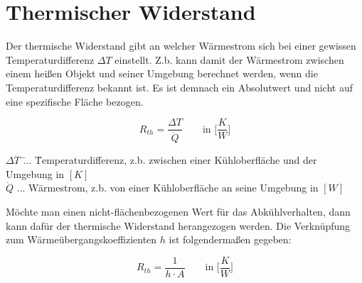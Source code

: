 \documentclass[a4paper, 10pt]{scrartcl}
\begin{document}
	\section{Thermischer Widerstand}
		Der thermische Widerstand gibt an welcher Wärmestrom sich bei einer gewissen Temperaturdifferenz $ \Delta T $ einstellt. Z.b. kann damit der Wärmestrom zwischen einem heißen Objekt und seiner Umgebung berechnet werden, wenn die Temperaturdifferenz bekannt ist. Es ist demnach ein Absolutwert und nicht auf eine spezifische Fläche bezogen.
		\begin{tcolorbox}[title=Definition des Wärmewiderstands]
			\[ R_{th} = \dfrac{\Delta T}{\dot{Q}} \qquad \text{in } \bigg[\frac{K}{W}\bigg]\]	
			\tcblower
			\begin{tabbing}
				$ \Delta T $ \= ... \= Temperaturdifferenz, z.b. zwischen einer Kühloberfläche und der Umgebung in $ [K] $\\	
				$ \dot{Q} $ \> ... \> Wärmestrom, z.b. von einer Kühloberfläche an seine Umgebung in $ [W] $\\	
			\end{tabbing}
			
		\end{tcolorbox}	
	
		Möchte man einen nicht-flächenbezogenen Wert für das Abkühlverhalten, dann kann dafür der thermische Widerstand herangezogen werden. Die Verknüpfung zum Wärmeübergangskoeffizienten $ h $ ist folgendermaßen gegeben:
		\begin{tcolorbox}[title=Bezug von thermischen Widerstand zum Wärmeübergangskoeffizienten]
			\[ R_{th} = \dfrac{1}{h\cdot A} \qquad \text{in } \bigg[\frac{K}{W}\bigg]\]			
		\end{tcolorbox}	
		
\end{document}
